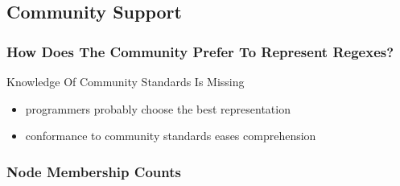 \subsection{Community Support}

{
\begin{frame}
\frametitle{How Does The Community Prefer To Represent Regexes?}
\begin{block}{\begin{Large}Knowledge Of Community Standards Is Missing\end{Large}}
\begin{itemize}
\item \begin{large}programmers probably choose the best representation\end{large}
\item \begin{large}conformance to community standards eases comprehension\end{large}
\end{itemize}
\end{block}
\end{frame}
}



\begin{frame}
\frametitle{Node Membership Counts}

\end{frame}

